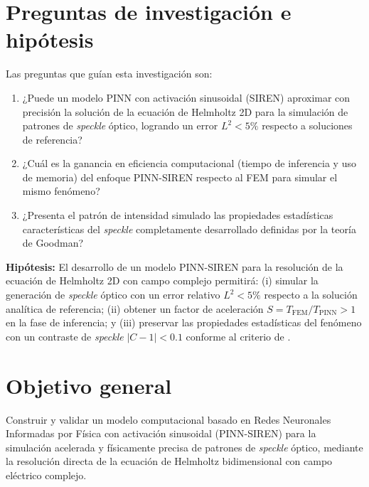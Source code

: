 \section{Preguntas de investigación e hipótesis}

Las preguntas que guían esta investigación son:

\begin{enumerate}
    \item ¿Puede un modelo PINN con activación sinusoidal (SIREN) aproximar
    con precisión la solución de la ecuación de Helmholtz 2D para la simulación
    de patrones de \textit{speckle} óptico, logrando un error $L^2 < 5\%$
    respecto a soluciones de referencia?

    \item ¿Cuál es la ganancia en eficiencia computacional (tiempo de inferencia
    y uso de memoria) del enfoque PINN-SIREN respecto al FEM para simular el
    mismo fenómeno?

    \item ¿Presenta el patrón de intensidad simulado las propiedades estadísticas
    características del \textit{speckle} completamente desarrollado definidas por
    la teoría de Goodman?
\end{enumerate}

\textbf{Hipótesis:} El desarrollo de un modelo PINN-SIREN para la resolución de
la ecuación de Helmholtz 2D con campo complejo permitirá:
(i) simular la generación de \textit{speckle} óptico con un error relativo
$L^2 < 5\%$ respecto a la solución analítica de referencia;
(ii) obtener un factor de aceleración $S = T_\text{FEM} / T_\text{PINN} > 1$ en
la fase de inferencia; y
(iii) preservar las propiedades estadísticas del fenómeno con un contraste de
\textit{speckle} $|C - 1| < 0.1$ conforme al criterio de \textcite{goodman2007speckle}.

\section{Objetivo general}

Construir y validar un modelo computacional basado en Redes Neuronales
Informadas por Física con activación sinusoidal (PINN-SIREN) para la simulación
acelerada y físicamente precisa de patrones de \textit{speckle} óptico, mediante
la resolución directa de la ecuación de Helmholtz bidimensional con campo
eléctrico complejo.

